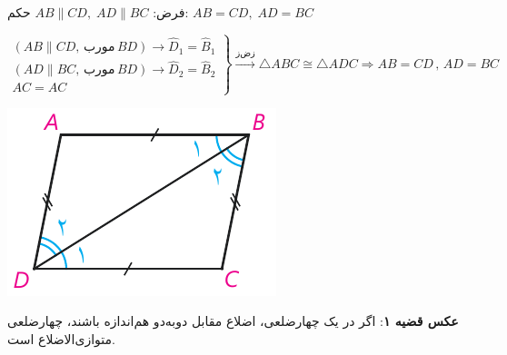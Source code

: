 \documentclass[12pt, a4paper]{book}
\begin{document}
\begin{minipage}{.75\textwidth}
 فرض: 
		$AB \parallel CD, \; AD \parallel BC$
		\hfill حکم:
		$AB = CD, \; AD = BC$
	\begin{flushleft}
			$ \left. \begin{array}{rll}
		(AB \parallel CD, \, \text{مورب} \, BD ) \rightarrow \widehat{D}_1 = \widehat{B}_1 \\ (AD \parallel BC, \, \text{مورب} \, BD ) \rightarrow \widehat{D}_2 = \widehat{B}_2 \\ AC =AC
		\end{array} \right\} \xrightarrow{\text{زض‌ز}} \triangle ABC \cong  \triangle ADC 
		\Rightarrow AB = CD \, , \, AD = BC$
	\end{flushleft}
\end{minipage}
\begin{minipage}{.25\textwidth}
	\begin{flushleft}
		\includegraphics[scale=0.8]{"Shapes/Fasl - 3/Dars 1/qazie 1.pdf"}
	\end{flushleft}
\end{minipage}

\textbf{عکس قضیه ۱}: اگر در یک چهارضلعی، اضلاع مقابل دوبه‌دو هم‌اندازه باشند، چهارضلعی متوازی‌الاضلاع است.
\end{document}

